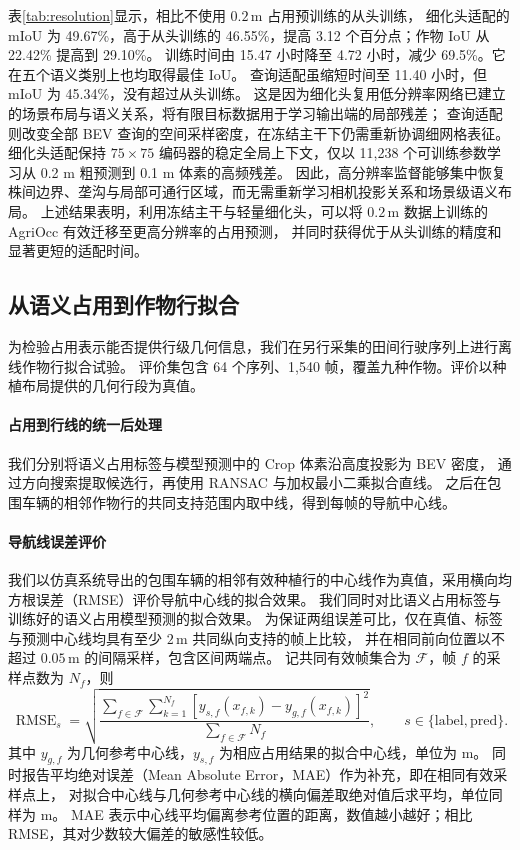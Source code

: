 \documentclass[a4paper,fleqn]{cas-sc}
\begin{document}
表\ref{tab:resolution}显示，相比不使用 $0.2\,\mathrm{m}$ 占用预训练的从头训练，
细化头适配的 mIoU 为 49.67\%，高于从头训练的 46.55\%，提高 3.12 个百分点；作物 IoU 从 22.42\% 提高到 29.10\%。
训练时间由 15.47 小时降至 4.72 小时，减少 69.5\%。它在五个语义类别上也均取得最佳 IoU。
查询适配虽缩短时间至 11.40 小时，但 mIoU 为 45.34\%，没有超过从头训练。
这是因为细化头复用低分辨率网络已建立的场景布局与语义关系，将有限目标数据用于学习输出端的局部残差；
查询适配则改变全部 BEV 查询的空间采样密度，在冻结主干下仍需重新协调细网格表征。
细化头适配保持 $75\times75$ 编码器的稳定全局上下文，仅以 11,238 个可训练参数学习从 0.2 m 粗预测到 0.1 m 体素的高频残差。
因此，高分辨率监督能够集中恢复株间边界、垄沟与局部可通行区域，而无需重新学习相机投影关系和场景级语义布局。
上述结果表明，利用冻结主干与轻量细化头，可以将 $0.2\,\mathrm{m}$ 数据上训练的 AgriOcc 有效迁移至更高分辨率的占用预测，
并同时获得优于从头训练的精度和显著更短的适配时间。

\subsection{从语义占用到作物行拟合}\label{sec:crop_row_fitting}
为检验占用表示能否提供行级几何信息，我们在另行采集的田间行驶序列上进行离线作物行拟合试验。
评价集包含 64 个序列、1,540 帧，覆盖九种作物。评价以种植布局提供的几何行段为真值。

\paragraph{占用到行线的统一后处理}
我们分别将语义占用标签与模型预测中的 Crop 体素沿高度投影为 BEV 密度，
通过方向搜索提取候选行，再使用 RANSAC 与加权最小二乘拟合直线。
之后在包围车辆的相邻作物行的共同支持范围内取中线，得到每帧的导航中心线。

\paragraph{导航线误差评价}
我们以仿真系统导出的包围车辆的相邻有效种植行的中心线作为真值，采用横向均方根误差（RMSE）评价导航中心线的拟合效果。
我们同时对比语义占用标签与训练好的语义占用模型预测的拟合效果。
为保证两组误差可比，仅在真值、标签与预测中心线均具有至少 $2\,\mathrm{m}$ 共同纵向支持的帧上比较，
并在相同前向位置以不超过 $0.05\,\mathrm{m}$ 的间隔采样，包含区间两端点。
记共同有效帧集合为 $\mathcal F$，帧 $f$ 的采样点数为 $N_f$，则
\begin{equation}
 \operatorname{RMSE}_s=\sqrt{\frac{
 \sum_{f\in\mathcal F}\sum_{k=1}^{N_f}
 \left[y_{s,f}(x_{f,k})-y_{g,f}(x_{f,k})\right]^2}{
 \sum_{f\in\mathcal F}N_f}},\qquad s\in\{\mathrm{label},\mathrm{pred}\}.
\end{equation}
其中 $y_{g,f}$ 为几何参考中心线，$y_{s,f}$ 为相应占用结果的拟合中心线，单位为 m。
同时报告平均绝对误差（Mean Absolute Error，MAE）作为补充，即在相同有效采样点上，
对拟合中心线与几何参考中心线的横向偏差取绝对值后求平均，单位同样为 m。
MAE 表示中心线平均偏离参考位置的距离，数值越小越好；相比 RMSE，其对少数较大偏差的敏感性较低。
\end{document}
